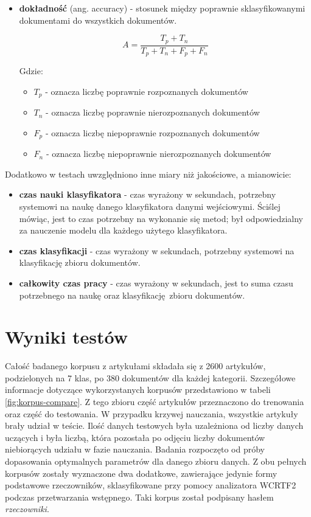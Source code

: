 \begin{itemize}
\item \textbf{dokładność} (ang. accuracy) - stosunek między poprawnie sklasyfikowanymi dokumentami do wszystkich dokumentów. \cite{skl-reference}

\begin{equation}
A = \frac{T_{p} + T_{n}}{T_{p} + T_{n} + F_{p} + F_{n}}
\end{equation}

Gdzie:
\begin{itemize}
\item $T_{p}$ - oznacza liczbę poprawnie rozpoznanych dokumentów
\item $T_{n}$ - oznacza liczbę poprawnie nierozpoznanych dokumentów
\item $F_{p}$ - oznacza liczbę niepoprawnie rozpoznanych dokumentów
\item $F_{n}$ - oznacza liczbę niepoprawnie nierozpoznanych dokumentów
\end{itemize}
\end{itemize}


Dodatkowo w testach uwzględniono inne miary niż jakościowe, a mianowicie:
\begin{itemize}
\item \textbf{czas nauki klasyfikatora} - czas wyrażony w sekundach, potrzebny systemowi na naukę danego klasyfikatora danymi wejściowymi. Ściślej mówiąc, jest to czas potrzebny na wykonanie się metod; był odpowiedzialny za nauczenie modelu dla każdego użytego klasyfikatora. 

\item \textbf{czas klasyfikacji} - czas wyrażony w sekundach, potrzebny systemowi na klasyfikację zbioru dokumentów. 

\item \textbf{całkowity czas pracy} - czas wyrażony w sekundach, jest to suma czasu potrzebnego na naukę oraz klasyfikację zbioru dokumentów.
\end{itemize}

\section{Wyniki testów}

Całość badanego korpusu z artykułami składała się z 2600 artykułów, podzielonych na 7 klas, po 380 dokumentów dla każdej kategorii. Szczegółowe informacje dotyczące wykorzystanych korpusów przedstawiono w tabeli \ref{fig:korpus-compare}. Z tego zbioru część artykułów przeznaczono do trenowania oraz część do testowania. W przypadku krzywej nauczania, wszystkie artykuły brały udział w teście. Ilość danych testowych była uzależniona od liczby danych uczących i była liczbą, która pozostała po odjęciu liczby dokumentów niebiorących udziału w fazie nauczania. Badania rozpoczęto od próby dopasowania optymalnych parametrów dla danego zbioru danych. Z obu pełnych korpusów zostały wyznaczone dwa dodatkowe, zawierające jedynie formy podstawowe rzeczowników, sklasyfikowane przy pomocy analizatora WCRTF2 podczas przetwarzania wstępnego. Taki korpus został podpisany hasłem \textit{rzeczowniki}.

